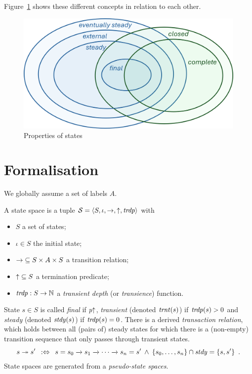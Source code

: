 \documentclass{article}
\begin{document}
Figure~\ref{fig:venn} shows these different concepts in relation to each other.

\begin{figure}
\centering
\includegraphics[scale=.5]{figs/venn}
\caption{Properties of states}
\label{fig:venn}
\end{figure}

\section*{Formalisation}

\medskip\noindent
We globally assume a set of labels $A$.

\medskip\noindent 
A state space is a tuple $\mathcal{S}=\langle{S,\iota,{\rightarrow},{{\uparrow}},\ensuremath{\mathit{trdp}}}\rangle$ with
\begin{itemize}
\item $S$ a set of states;
\item $\iota\in S$ the initial state;
\item ${\rightarrow}\subseteq S\times A\times S$ a transition relation;
\item ${{\uparrow}}\subseteq S$ a termination predicate;
\item ${\mathit{trdp}}:S\to \mathbb{N}$ a \emph{transient depth} (or \emph{transience}) function.
\end{itemize}
%
State $s\in S$ is called \emph{final} if $p{\uparrow}$, \emph{transient} (denoted $\mathit{trnt}(s)$) if $\mathit{trdp}(s)>0$ and \emph{steady} (denoted $\mathit{stdy}(s)$) if $\mathit{trdp}(s)=0$. There is a derived \emph{transaction relation}, which holds between all (pairs of) steady states for which there is a (non-empty) transition sequence that only passes through transient states.
%
\[ s\ttrans s' \enspace\iffdef\enspace
   s=s_0\trans{} s_1\trans{} \cdots \trans{} s_n=s' \:\wedge\:
   \setof{s_0,\ldots,s_n} \cap \Steady=\setof{s,s'}  \enspace.
\]
%
State spaces are generated from a \emph{pseudo-state spaces}.
\end{document}
